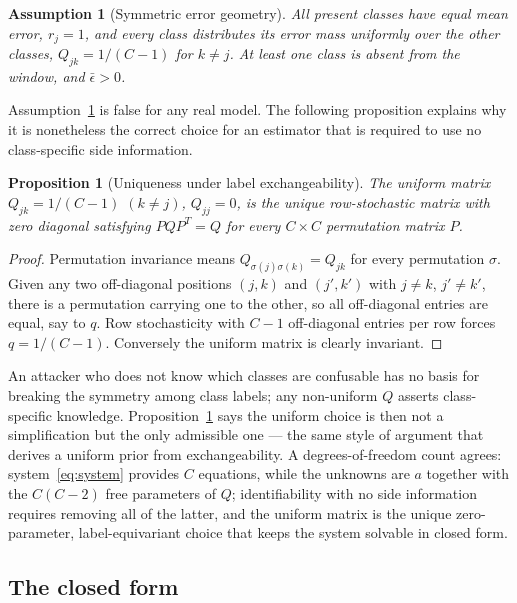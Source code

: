 \documentclass[11pt]{article}
\newtheorem{assumption}{Assumption}
\newtheorem{proposition}{Proposition}
\theoremstyle{remark}
\begin{document}
\begin{assumption}[Symmetric error geometry]
\label{ass:sym}
All present classes have equal mean error, $r_j = 1$, and every class
distributes its error mass uniformly over the other classes,
$Q_{jk} = 1/(C-1)$ for $k \ne j$. At least one class is absent from the
window, and $\bar\epsilon > 0$.
\end{assumption}

Assumption~\ref{ass:sym} is false for any real model. The following
proposition explains why it is nonetheless the correct choice for an
estimator that is required to use no class-specific side information.

\begin{proposition}[Uniqueness under label exchangeability]
\label{prop:exchange}
The uniform matrix $Q_{jk} = 1/(C-1)$ $(k\ne j)$, $Q_{jj}=0$, is the
\emph{unique} row-stochastic matrix with zero diagonal satisfying
$P Q P^T = Q$ for every $C\times C$ permutation matrix $P$.
\end{proposition}

\begin{proof}
Permutation invariance means $Q_{\sigma(j)\sigma(k)} = Q_{jk}$ for every
permutation $\sigma$. Given any two off-diagonal positions $(j,k)$ and
$(j',k')$ with $j\ne k$, $j'\ne k'$, there is a permutation carrying one to
the other, so all off-diagonal entries are equal, say to $q$. Row
stochasticity with $C-1$ off-diagonal entries per row forces
$q = 1/(C-1)$. Conversely the uniform matrix is clearly invariant.
\end{proof}

An attacker who does not know which classes are confusable has no basis for
breaking the symmetry among class labels; any non-uniform $Q$ asserts
class-specific knowledge. Proposition~\ref{prop:exchange} says the uniform
choice is then not a simplification but the only admissible one --- the same
style of argument that derives a uniform prior from exchangeability. A
degrees-of-freedom count agrees: system~\eqref{eq:system} provides $C$
equations, while the unknowns are $a$ together with the $C(C-2)$ free
parameters of $Q$; identifiability with no side information requires removing
all of the latter, and the uniform matrix is the unique zero-parameter,
label-equivariant choice that keeps the system solvable in closed form.

\subsection{The closed form}
\end{document}

